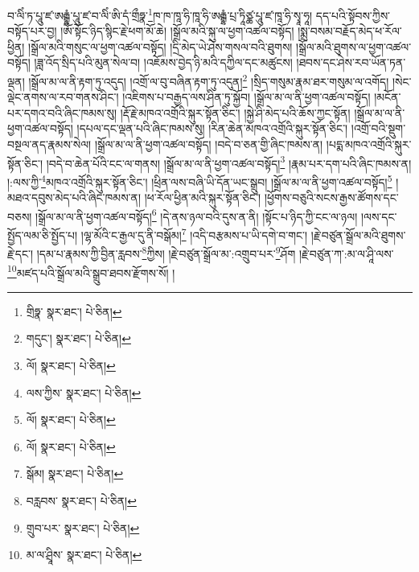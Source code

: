 བ་ལིཾ་ཏ་པཱུ་ཛ་ཨརྒྷཾ་པཱུ་ཛ་བ་ལིཾ་ཨི་དཾ་གྲྀཧྣ་\footnote{གྲིཧྣ་  སྣར་ཐང་།  པེ་ཅིན། }ཁ་ཁ་ཁཱ་ཧི་ཁཱ་ཧི་ཨརྒྷཾ་པྲ་ཏཱིཙྪ་པཱུ་ཛ་ཁཱ་ཧི་སྭཱ་ཧཱ། དད་པའི་སྟོབས་ཀྱིས་བསྟོད་པར་བྱ། །ཨོཾ་སྟོང་ཉིད་སྙིང་རྗེ་ཕག་མོ་ཆེ། །སྒྲོལ་མའི་སྐུ་ལ་ཕྱག་འཚལ་བསྟོད། །སྨྲ་བསམ་བརྗོད་མེད་ཕ་རོལ་ཕྱིན། །སྒྲོལ་མའི་གསུང་ལ་ཕྱག་འཚལ་བསྟོད། །དྲི་མེད་ཡེ་ཤེས་གསལ་བའི་ཐུགས། །སྒྲོལ་མའི་ཐུགས་ལ་ཕྱག་འཚལ་བསྟོད། །ཟླ་འོད་སྲིད་པའི་མུན་སེལ་བ། །འཇོམས་བྱེད་ཉི་མའི་དཀྱིལ་དང་མཚུངས། །ཐབས་དང་ཤེས་རབ་ཡོན་ཏན་ལྡན། །སྒྲོལ་མ་ལ་ནི་རྟག་ཏུ་འདུད། །འགྲོ་ལ་བུ་བཞིན་རྟག་ཏུ་འདུན།\footnote{གདུང་།  སྣར་ཐང་།  པེ་ཅིན། } །སྲིད་གསུམ་རྣམ་ཐར་གསུམ་ལ་འགོད། །སེང་ལྡེང་ནགས་ལ་རབ་གནས་ཤིང་། །འཇིགས་པ་བརྒྱད་ལས་ཤིན་ཏུ་སྐྱོབ། །སྒྲོལ་མ་ལ་ནི་ཕྱག་འཚལ་བསྟོད། །མངོན་པར་དགའ་བའི་ཞིང་ཁམས་སུ། །རྡོ་རྗེ་མཁའ་འགྲོའི་སྐུར་སྟོན་ཅིང་། །སྐྱེ་ཤི་མེད་པའི་ཆོས་ཀྱང་སྟོན། །སྒྲོལ་མ་ལ་ནི་ཕྱག་འཚལ་བསྟོད། །དཔལ་དང་ལྡན་པའི་ཞིང་ཁམས་སུ། །རིན་ཆེན་མཁའ་འགྲོའི་སྐུར་སྟོན་ཅིང་། །འགྲོ་བའི་སྡུག་བསྔལ་ནད་རྣམས་སེལ། །སྒྲོལ་མ་ལ་ནི་ཕྱག་འཚལ་བསྟོད། །བདེ་བ་ཅན་གྱི་ཞིང་ཁམས་ན། །པདྨ་མཁའ་འགྲོའི་སྐུར་སྟོན་ཅིང་། །བདེ་བ་ཆེན་པོའི་ངང་ལ་གནས། །སྒྲོལ་མ་ལ་ནི་ཕྱག་འཚལ་བསྟོད།\footnote{ལོ།  སྣར་ཐང་།  པེ་ཅིན། } །རྣམ་པར་དག་པའི་ཞིང་ཁམས་ན། །:ལས་ཀྱི་\footnote{ལས་ཀྱིས་  སྣར་ཐང་།  པེ་ཅིན། }མཁའ་འགྲོའི་སྐུར་སྟོན་ཅིང་། །ཕྲིན་ལས་བཞི་ཡི་དོན་ཡང་སྒྲུབ། །སྒྲོལ་མ་ལ་ནི་ཕྱག་འཚལ་བསྟོད།\footnote{ལོ།  སྣར་ཐང་།  པེ་ཅིན། } །མཐའ་དབུས་མེད་པའི་ཞིང་ཁམས་ན། །ཕ་རོལ་ཕྱིན་མའི་སྐུར་སྟོན་ཅིང་། །ཕྱོགས་བཅུའི་སངས་རྒྱས་ཚོགས་དང་བཅས། །སྒྲོལ་མ་ལ་ནི་ཕྱག་འཚལ་བསྟོད།\footnote{ལོ།  སྣར་ཐང་།  པེ་ཅིན། } །དེ་ནས་ཉལ་བའི་དུས་ན་ནི། །སྟོང་པ་ཉིད་ཀྱི་ངང་ལ་ཉལ། །ལས་དང་སྤྱོད་ལམ་ཅི་སྤྱོད་པ། །ལྷ་མོའི་ང་རྒྱལ་དུ་ནི་བསྒོམ།\footnote{སྒོམ།  སྣར་ཐང་།  པེ་ཅིན། } །འདི་བརྩམས་པ་ཡི་དགེ་བ་གང་། །རྗེ་བཙུན་སྒྲོལ་མའི་ཐུགས་རྗེ་དང་། །དམ་པ་རྣམས་ཀྱི་བྱིན་རླབས་\footnote{བརླབས་  སྣར་ཐང་།  པེ་ཅིན། }ཀྱིས། །རྗེ་བཙུན་སྒྲོལ་མ་:འགྲུབ་པར་\footnote{གྲུབ་པར་  སྣར་ཐང་།  པེ་ཅིན། }ཤོག །རྗེ་བཙུན་ཀ་:མ་ལ་ཤཱི་ལས་\footnote{མ་ལ་ཤྲཱིས་  སྣར་ཐང་།  པེ་ཅིན། }མཛད་པའི་སྒྲོལ་མའི་སྒྲུབ་ཐབས་རྫོགས་སོ། ། 